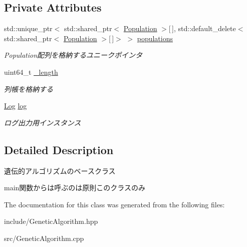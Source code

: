 \subsection*{Private Attributes}
\begin{DoxyCompactItemize}
\item 
\mbox{\label{class_g_a_1_1_genetic_algorithm_aa289043454c31ce1c815a95eb7ffdbde}} 
std\+::unique\+\_\+ptr$<$ std\+::shared\+\_\+ptr$<$ \mbox{\hyperlink{class_g_a_1_1_population}{Population}} $>$\mbox{[}$\,$\mbox{]}, std\+::default\+\_\+delete$<$ std\+::shared\+\_\+ptr$<$ \mbox{\hyperlink{class_g_a_1_1_population}{Population}} $>$\mbox{[}$\,$\mbox{]}$>$ $>$ \mbox{\hyperlink{class_g_a_1_1_genetic_algorithm_aa289043454c31ce1c815a95eb7ffdbde}{populations}}
\begin{DoxyCompactList}\small\item\em Population配列を格納するユニークポインタ \end{DoxyCompactList}\item 
\mbox{\label{class_g_a_1_1_genetic_algorithm_ae478c53fd0b276bd27e31af2d8b37ce1}} 
uint64\+\_\+t \mbox{\hyperlink{class_g_a_1_1_genetic_algorithm_ae478c53fd0b276bd27e31af2d8b37ce1}{\+\_\+length}}
\begin{DoxyCompactList}\small\item\em 列帳を格納する \end{DoxyCompactList}\item 
\mbox{\label{class_g_a_1_1_genetic_algorithm_a715b2216b6e091f29738494ea2e8eadd}} 
\mbox{\hyperlink{class_g_a_1_1_log}{Log}} \mbox{\hyperlink{class_g_a_1_1_genetic_algorithm_a715b2216b6e091f29738494ea2e8eadd}{log}}
\begin{DoxyCompactList}\small\item\em ログ出力用インスタンス \end{DoxyCompactList}\end{DoxyCompactItemize}


\subsection{Detailed Description}
遺伝的アルゴリズムのベースクラス 

main関数からは呼ぶのは原則このクラスのみ 

The documentation for this class was generated from the following files\+:\begin{DoxyCompactItemize}
\item 
include/Genetic\+Algorithm.\+hpp\item 
src/Genetic\+Algorithm.\+cpp\end{DoxyCompactItemize}
